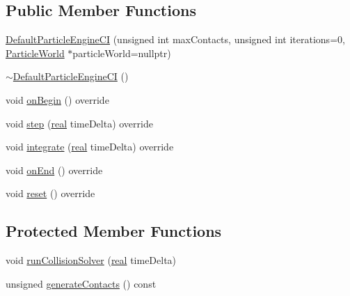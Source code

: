 \subsection*{Public Member Functions}
\begin{DoxyCompactItemize}
\item 
\mbox{\hyperlink{classrum_1_1_default_particle_engine_c_i_abf22f5dfc77e2e7cd2c06c603820b54a}{Default\+Particle\+Engine\+CI}} (unsigned int max\+Contacts, unsigned int iterations=0, \mbox{\hyperlink{classrum_1_1_particle_world}{Particle\+World}} $\ast$particle\+World=nullptr)
\item 
\mbox{\hyperlink{classrum_1_1_default_particle_engine_c_i_aa832d8621e3ed0b88068eaa10062da03}{$\sim$\+Default\+Particle\+Engine\+CI}} ()
\item 
void \mbox{\hyperlink{classrum_1_1_default_particle_engine_c_i_a2f28a0930c60c5d2c0d0cf3904bd6d25}{on\+Begin}} () override
\item 
void \mbox{\hyperlink{classrum_1_1_default_particle_engine_c_i_a1176bc40c952f1be6d61b44bf7eb281c}{step}} (\mbox{\hyperlink{namespacerum_a7e8cca23573d5eaead0f138cbaa4862c}{real}} time\+Delta) override
\item 
void \mbox{\hyperlink{classrum_1_1_default_particle_engine_c_i_a93e44a2355faaea31795206eb4ecbb86}{integrate}} (\mbox{\hyperlink{namespacerum_a7e8cca23573d5eaead0f138cbaa4862c}{real}} time\+Delta) override
\item 
void \mbox{\hyperlink{classrum_1_1_default_particle_engine_c_i_ae478e3b581c3a6b306219c19552ff282}{on\+End}} () override
\item 
void \mbox{\hyperlink{classrum_1_1_default_particle_engine_c_i_a826fdf25ee18128e2fd0944e7771b387}{reset}} () override
\end{DoxyCompactItemize}
\subsection*{Protected Member Functions}
\begin{DoxyCompactItemize}
\item 
void \mbox{\hyperlink{classrum_1_1_default_particle_engine_c_i_ae816a8ccbd617510ad5f2d39f2075314}{run\+Collision\+Solver}} (\mbox{\hyperlink{namespacerum_a7e8cca23573d5eaead0f138cbaa4862c}{real}} time\+Delta)
\item 
unsigned \mbox{\hyperlink{classrum_1_1_default_particle_engine_c_i_a6bc4688a3c4dbb71a9b16f29b54e5120}{generate\+Contacts}} () const
\end{DoxyCompactItemize}
